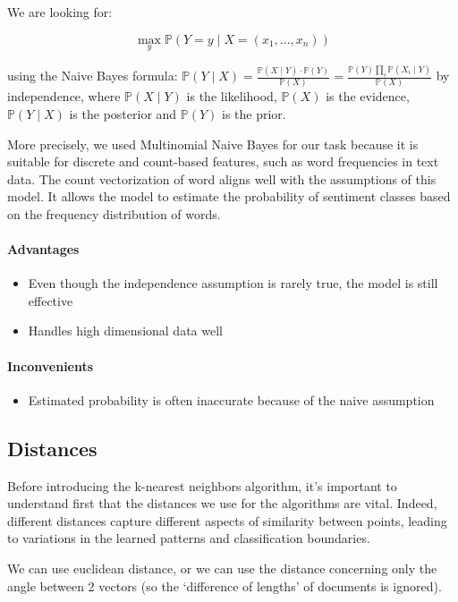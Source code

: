 \documentclass{article}
\begin{document}
We are looking for:

$$ \max_{y}\mathbb{P}(Y =y \mid X=(x_1, ..., x_n)) $$

using the Naive Bayes formula: $\mathbb{P}(Y \mid X) = \frac{\mathbb{P}(X\mid Y)\cdot \mathbb{P}(Y)}{\mathbb{P}(X)} = \frac{\mathbb{P}(Y)\prod_{i}^{}\mathbb{P}(X_i\mid Y)}{\mathbb{P}(X)}$
by independence,
where $\mathbb{P}(X\mid Y)$ is the likelihood, $\mathbb{P}(X)$ is the evidence, $\mathbb{P}(Y \mid X)$ is the posterior and $\mathbb{P}(Y)$ is the prior.

More precisely, we used Multinomial Naive Bayes for our task because it is suitable for discrete and count-based features, such as word frequencies in text data. The count vectorization of word aligns well with the assumptions of this model. It allows the model to estimate the probability of sentiment classes based on the frequency distribution of words.

\paragraph{Advantages} \begin{itemize}
\item Even though the independence assumption is rarely true, the model is still effective
\item Handles high dimensional data well
\end{itemize}

\paragraph{Inconvenients} \begin{itemize}
\item Estimated probability is often inaccurate because of the naive assumption
\end{itemize}

\subsection{Distances}

Before introducing the k-nearest neighbors algorithm, it's important to understand first that the distances we use for the algorithms are vital. Indeed, different distances capture different aspects of similarity between points, leading to variations in the learned patterns and classification boundaries.

We can use euclidean distance, or we can use the distance concerning
only the angle between 2 vectors (so the `difference of lengths' of documents
is ignored).
\end{document}
